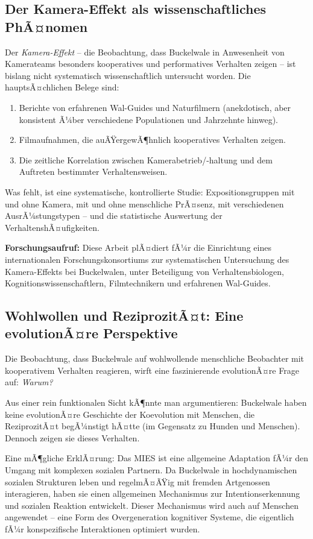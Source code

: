 ﻿\documentclass[12pt,a4paper]{article}
\theoremstyle{definition}
\theoremstyle{remark}
\begin{document}
\subsection{Der Kamera-Effekt als wissenschaftliches PhÃ¤nomen}

Der \emph{Kamera-Effekt} -- die Beobachtung, dass Buckelwale in Anwesenheit
von Kamerateams besonders kooperatives und performatives Verhalten zeigen
-- ist bislang nicht systematisch wissenschaftlich untersucht worden. Die
hauptsÃ¤chlichen Belege sind:

\begin{enumerate}
  \item Berichte von erfahrenen Wal-Guides und Naturfilmern (anekdotisch,
        aber konsistent Ã¼ber verschiedene Populationen und Jahrzehnte hinweg).
  \item Filmaufnahmen, die auÃŸergewÃ¶hnlich kooperatives Verhalten zeigen.
  \item Die zeitliche Korrelation zwischen Kamerabetrieb/-haltung und dem
        Auftreten bestimmter Verhaltensweisen.
\end{enumerate}

Was fehlt, ist eine systematische, kontrollierte Studie: Expositionsgruppen
mit und ohne Kamera, mit und ohne menschliche PrÃ¤senz, mit verschiedenen
AusrÃ¼stungstypen -- und die statistische Auswertung der VerhaltenshÃ¤ufigkeiten.

\textbf{Forschungsaufruf:} Diese Arbeit plÃ¤diert fÃ¼r die Einrichtung eines
internationalen Forschungskonsortiums zur systematischen Untersuchung des
Kamera-Effekts bei Buckelwalen, unter Beteiligung von Verhaltensbiologen,
Kognitionswissenschaftlern, Filmtechnikern und erfahrenen Wal-Guides.

\subsection{Wohlwollen und ReziprozitÃ¤t: Eine evolutionÃ¤re Perspektive}

Die Beobachtung, dass Buckelwale auf wohlwollende menschliche Beobachter
mit kooperativem Verhalten reagieren, wirft eine faszinierende evolutionÃ¤re
Frage auf: \emph{Warum?}

Aus einer rein funktionalen Sicht kÃ¶nnte man argumentieren: Buckelwale haben
keine evolutionÃ¤re Geschichte der Koevolution mit Menschen, die ReziprozitÃ¤t
begÃ¼nstigt hÃ¤tte (im Gegensatz zu Hunden und Menschen). Dennoch zeigen sie
dieses Verhalten.

Eine mÃ¶gliche ErklÃ¤rung: Das MIES ist eine allgemeine Adaptation fÃ¼r den
Umgang mit komplexen sozialen Partnern. Da Buckelwale in hochdynamischen sozialen
Strukturen leben und regelmÃ¤ÃŸig mit fremden Artgenossen interagieren, haben
sie einen allgemeinen Mechanismus zur Intentionserkennung und sozialen Reaktion
entwickelt. Dieser Mechanismus wird auch auf Menschen angewendet -- eine Form
des Overgeneration kognitiver Systeme, die eigentlich fÃ¼r konspezifische
Interaktionen optimiert wurden.
\end{document}
